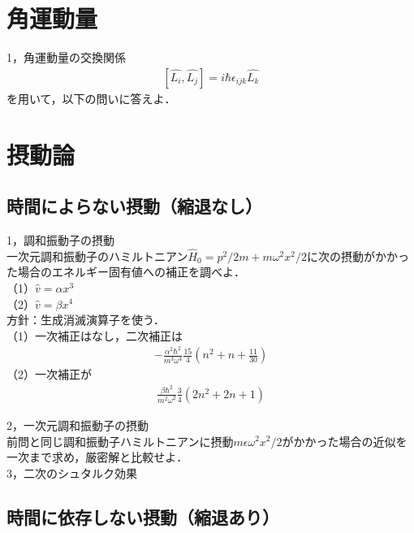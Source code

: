 \documentclass[a4j]{jarticle}
\begin{document}
\section{角運動量}
1，角運動量の交換関係
\begin{align*}
\left[\hat{L_i},\hat{L_j}\right]=i\hbar\epsilon_{ijk}\hat{L_k}
\end{align*}
を用いて，以下の問いに答えよ．


\section{摂動論}
\subsection{時間によらない摂動（縮退なし）}

1，調和振動子の摂動\\
一次元調和振動子のハミルトニアン$\hat{H}_0=p^2/2m+m\omega^2x^2/2$に次の摂動がかかった場合のエネルギー固有値への補正を調べよ．\\
（1）$\hat{v}=\alpha x^3$\\
（2）$\hat{v}=\beta x^4$\\

方針：生成消滅演算子を使う．\\
（1）一次補正はなし，二次補正は
\begin{align*}
 -\frac{\alpha^2\hbar^2}{m^3\omega^4}\frac{15}{4}\left(n^2+n+\frac{11}{30}\right)
\end{align*}
（2）一次補正が
\begin{align*}
 \frac{\beta\hbar^2}{m^2\omega^2}\frac{3}{4}(2n^2+2n+1)
\end{align*}

2，一次元調和振動子の摂動\\
前問と同じ調和振動子ハミルトニアンに摂動$m\epsilon \omega^2 x^2/2$がかかった場合の近似を一次まで求め，厳密解と比較せよ．\\

3，二次のシュタルク効果\\



\subsection{時間に依存しない摂動（縮退あり）}
\end{document}
